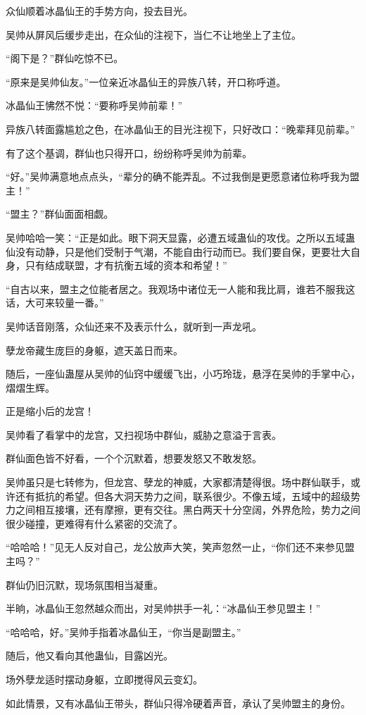 \begin{this_body}
众仙顺着冰晶仙王的手势方向，投去目光。

吴帅从屏风后缓步走出，在众仙的注视下，当仁不让地坐上了主位。

“阁下是？”群仙吃惊不已。

“原来是吴帅仙友。”一位亲近冰晶仙王的异族八转，开口称呼道。

冰晶仙王怫然不悦：“要称呼吴帅前辈！”

异族八转面露尴尬之色，在冰晶仙王的目光注视下，只好改口：“晚辈拜见前辈。”

有了这个基调，群仙也只得开口，纷纷称呼吴帅为前辈。

“好。”吴帅满意地点点头，“辈分的确不能弄乱。不过我倒是更愿意诸位称呼我为盟主！”

“盟主？”群仙面面相觑。

吴帅哈哈一笑：“正是如此。眼下洞天显露，必遭五域蛊仙的攻伐。之所以五域蛊仙没有动静，只是他们受制于气潮，不能自由行动而已。我们要自保，更要壮大自身，只有结成联盟，才有抗衡五域的资本和希望！”

“自古以来，盟主之位能者居之。我观场中诸位无一人能和我比肩，谁若不服我这话，大可来较量一番。”

吴帅话音刚落，众仙还来不及表示什么，就听到一声龙吼。

孽龙帝藏生庞巨的身躯，遮天盖日而来。

随后，一座仙蛊屋从吴帅的仙窍中缓缓飞出，小巧玲珑，悬浮在吴帅的手掌中心，熠熠生辉。

正是缩小后的龙宫！

吴帅看了看掌中的龙宫，又扫视场中群仙，威胁之意溢于言表。

群仙面色皆不好看，一个个沉默着，想要发怒又不敢发怒。

吴帅虽只是七转修为，但龙宫、孽龙的神威，大家都清楚得很。场中群仙联手，或许还有抵抗的希望。但各大洞天势力之间，联系很少。不像五域，五域中的超级势力之间相互接壤，还有摩擦，更有交往。黑白两天十分空阔，外界危险，势力之间很少碰撞，更难得有什么紧密的交流了。

“哈哈哈！”见无人反对自己，龙公放声大笑，笑声忽然一止，“你们还不来参见盟主吗？”

群仙仍旧沉默，现场氛围相当凝重。

半晌，冰晶仙王忽然越众而出，对吴帅拱手一礼：“冰晶仙王参见盟主！”

“哈哈哈，好。”吴帅手指着冰晶仙王，“你当是副盟主。”

随后，他又看向其他蛊仙，目露凶光。

场外孽龙适时摆动身躯，立即搅得风云变幻。

如此情景，又有冰晶仙王带头，群仙只得冷硬着声音，承认了吴帅盟主的身份。


\end{this_body}
